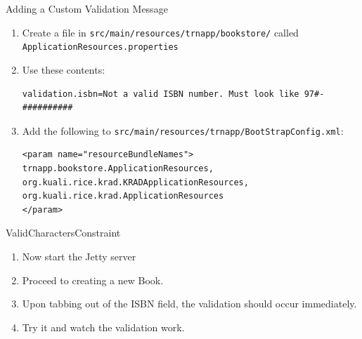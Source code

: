 \documentclass[xcolor=dvipsnames,14pt,professionalfonts]{beamer}
\begin{document}
\begin{frame}[fragile]{Adding a Custom Validation Message}
  \begin{enumerate}
    \item Create a file in
      \texttt{src/main/resources/trnapp/bookstore/} called
      \texttt{ApplicationResources.properties}
    \item Use these contents:
    \begin{verbatim}
validation.isbn=Not a valid ISBN number. Must look like 97#-##########
    \end{verbatim}
    \item Add the following to
      \texttt{src/main/resources/trnapp/BootStrapConfig.xml}:
    \begin{verbatim}
<param name="resourceBundleNames">
trnapp.bookstore.ApplicationResources,
org.kuali.rice.krad.KRADApplicationResources,
org.kuali.rice.krad.ApplicationResources
</param>
    \end{verbatim}
  \end{enumerate}
    
\end{frame}

\begin{frame}{ValidCharactersConstraint}
  \begin{enumerate}
    \item Now start the Jetty server
    \item Proceed to creating a new Book.
    \item Upon tabbing out of the ISBN field, the validation should
      occur immediately. 
    \item Try it and watch the validation work.
  \end{enumerate}
\end{frame}
\end{document}
